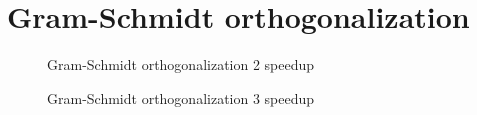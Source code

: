 \section{Gram-Schmidt orthogonalization}

\begin{figure}[!h]
  \begin{center}
  \end{center}
  \caption{Gram-Schmidt orthogonalization 2 speedup}
  \label{fig:gram2}
\end{figure}

\begin{figure}[!h]
  \begin{center}
  \end{center}
  \caption{Gram-Schmidt orthogonalization 3 speedup}
  \label{fig:gram3}
\end{figure}


